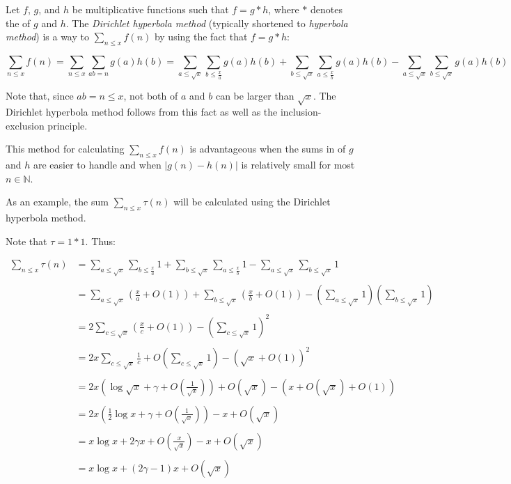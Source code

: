 \documentclass[12pt]{article}
\begin{document}
Let $f$, $g$, and $h$ be multiplicative functions such that $f=g*h$, where $*$ denotes the  of $g$ and $h$. The {\sl Dirichlet hyperbola method\/} (typically shortened to {\sl hyperbola method\/}) is a way to  $\displaystyle \sum_{n \le x} f(n)$ by using the fact that $f=g*h$:

$$\sum_{n \le x} f(n) = \sum_{n \le x} \sum_{ab=n} g(a)h(b) = \sum_{a \le \sqrt{x}} \sum_{b \le \frac{x}{a}} g(a)h(b) + \sum_{b \le \sqrt{x}} \sum_{a \le \frac{x}{b}} g(a)h(b) - \sum_{a \le \sqrt{x}} \sum_{b \le \sqrt{x}} g(a)h(b)$$

Note that, since $ab=n \le x$, not both of $a$ and $b$ can be larger than $\sqrt{x}$.  The Dirichlet hyperbola method follows from this fact as well as the inclusion-exclusion principle.

This method for calculating $\displaystyle \sum_{n \le x} f(n)$ is advantageous when the sums in  of $g$ and $h$ are easier to handle and when $|g(n)-h(n)|$ is relatively small for most $n \in \mathbb{N}$.

As an example, the sum $\displaystyle \sum_{n \le x} \tau(n)$ will be calculated using the Dirichlet hyperbola method.

Note that $\tau=1*1$.  Thus:

\begin{center}
$\begin{array}{ll}
\displaystyle \sum_{n \le x} \tau(n) & \displaystyle = \sum_{a \le \sqrt{x}} \sum_{b \le \frac{x}{a}} 1 + \sum_{b \le \sqrt{x}} \sum_{a \le \frac{x}{b}} 1 - \sum_{a \le \sqrt{x}} \sum_{b \le \sqrt{x}} 1 \\
& \\
& \displaystyle = \sum_{a \le \sqrt{x}} \left( \frac{x}{a} + O(1) \right) + \sum_{b \le \sqrt{x}} \left( \frac{x}{b} + O(1) \right) - \left( \sum_{a \le \sqrt{x}} 1 \right) \left( \sum_{b \le \sqrt{x}} 1 \right) \\
& \\
& \displaystyle = 2 \sum_{c \le \sqrt{x}} \left( \frac{x}{c} + O(1) \right) - \left( \sum_{c \le \sqrt{x}} 1 \right)^2 \\
& \\
& \displaystyle = 2x \sum_{c \le \sqrt{x}} \frac{1}{c} + O \left( \sum_{c \le \sqrt{x}} 1 \right) - (\sqrt{x}+O(1))^2 \\
& \\
& \displaystyle = 2x \left( \log \sqrt{x} + \gamma + O \left( \frac{1}{\sqrt{x}} \right) \right) + O(\sqrt{x}) - \left( x + O(\sqrt{x}) + O(1) \right) \\
& \\
& \displaystyle = 2x \left( \frac{1}{2} \log x + \gamma + O \left( \frac{1}{\sqrt{x}} \right) \right) - x + O(\sqrt{x}) \\
& \\
& \displaystyle = x \log x + 2 \gamma x + O \left( \frac{x}{\sqrt{x}} \right) - x + O(\sqrt{x}) \\
& \\
& \displaystyle = x \log x + (2 \gamma - 1)x + O(\sqrt{x}) \end{array}$
\end{center}
\end{document}
